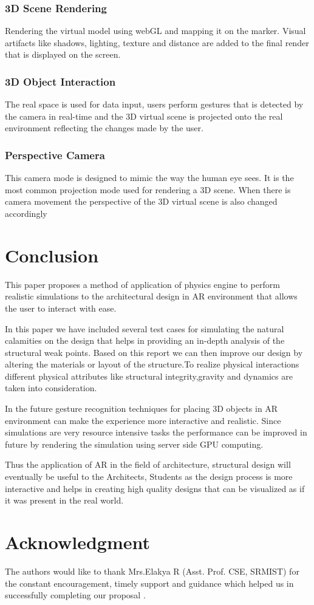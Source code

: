 \documentclass[conference]{IEEEtran}
\begin{document}
\subsubsection{3D Scene Rendering}
Rendering the virtual model using webGL and mapping it on the marker. Visual artifacts like shadows, lighting, texture and distance are added to the final render that is displayed on the screen.
\subsubsection{3D Object Interaction}
The real space is used for data input, users perform gestures that is detected by the camera in real-time and the 3D virtual scene is projected onto the real environment reflecting the changes made by the user.

\subsubsection{Perspective Camera}
This camera mode is designed to mimic the way the human eye sees. It is the most common projection mode used for rendering a 3D scene. When there is camera movement the perspective of the 3D virtual scene is also changed accordingly
\section{Conclusion}
This paper proposes a method of application of physics engine to perform realistic simulations to the architectural design in AR environment that allows the user to interact with ease.

In this paper we have included several test cases for simulating the natural calamities on the design that helps in providing an in-depth analysis of the structural weak points. Based on this report we can then improve our design by altering the materials or layout of the structure.To realize physical interactions different physical attributes like structural integrity,gravity and dynamics are taken into consideration. 

In the future gesture recognition techniques for placing 3D objects in AR environment can make the experience more interactive and realistic.
Since simulations are very resource intensive tasks the performance can be improved in future by rendering the simulation using server side GPU computing.

Thus the application of AR in the field of architecture, structural design will eventually be useful to the Architects, Students as the design process is more interactive and helps in creating high quality designs that can be visualized as if it was present in the real world.

\section*{Acknowledgment}
The authors would like to thank Mrs.Elakya R (Asst. Prof. CSE, SRMIST) for the constant encouragement, timely support and guidance which helped us in successfully completing our proposal .




\end{document}
